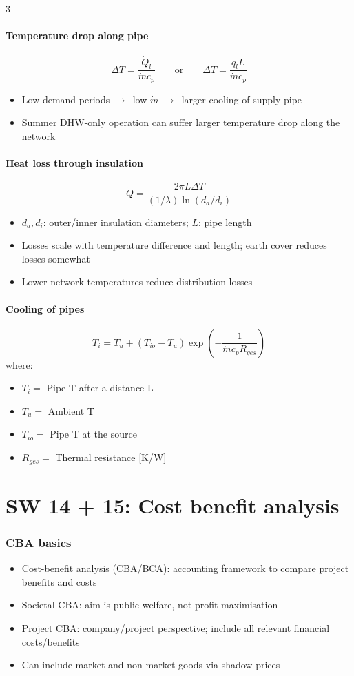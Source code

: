 \documentclass[9pt, landscape, a4paper]{article}
\let\mathto\to
\renewcommand{\to}{\ensuremath{\mathto}\ }
\begin{document}
\begin{multicols*}{3}
\subsection{Temperature drop along pipe}
\[\Delta T = \frac{\dot Q_l}{\dot m c_p}\qquad \text{or} \qquad\Delta T = \frac{q_l L}{\dot m c_p}\]
\begin{itemize}
  \item Low demand periods \to low $\dot m$ \to larger cooling of supply pipe
  \item Summer DHW-only operation can suffer larger temperature drop along the network
\end{itemize}

\subsection{Heat loss through insulation}
\[\dot Q = \frac{2\pi L\Delta T}{(1/\lambda)\ln(d_a/d_i)}\]
\begin{itemize}
  \item $d_a,d_i$: outer/inner insulation diameters; $L$: pipe length
  \item Losses scale with temperature difference and length; earth cover reduces losses somewhat
  \item Lower network temperatures reduce distribution losses
\end{itemize}

\subsection{Cooling of pipes}
\[T_i = T_u + \left(T_{io} - T_u\right)\exp\left(-\dfrac{1}{\dot{m} c_p R_{ges}}\right)\]
where:
\vspace*{-.2cm}
\begin{itemize}
  \item $T_i =$ Pipe T after a distance L
  \item $T_u =$ Ambient T
  \item $T_{io} =$ Pipe T at the source
  \item $R_{ges} =$ Thermal resistance [K/W]
\end{itemize}

\part{SW 14 + 15: Cost benefit analysis}

\section{CBA basics}
\begin{itemize}
  \item Cost-benefit analysis (CBA/BCA): accounting framework to compare project benefits and costs
  \item Societal CBA: aim is public welfare, not profit maximisation
  \item Project CBA: company/project perspective; include all relevant financial costs/benefits
  \item Can include market and non-market goods via shadow prices
\end{itemize}


\end{multicols*}
\end{document}
